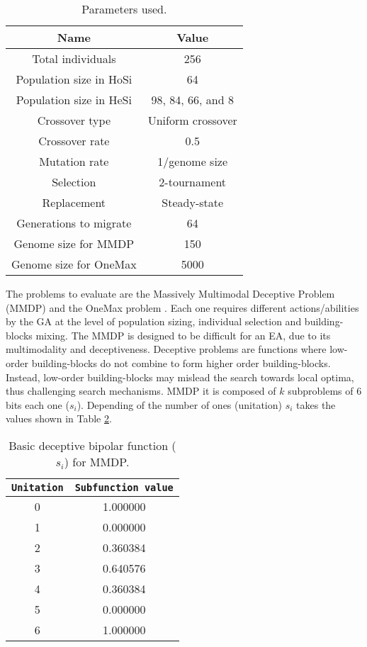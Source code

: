\begin{table}
\centering
\caption{Parameters used.}
\begin{tabular}{|c|c|} \hline
Name & Value\\ \hline
Total individuals & 256\\ \hline
Population size in HoSi & 64 \\ \hline
Population size in HeSi & 98, 84, 66, and 8\\ \hline
Crossover type & Uniform crossover \\ \hline
Crossover rate & 0.5\\ \hline
Mutation rate & 1/genome size\\ \hline
Selection & 2-tournament \\ \hline
Replacement & Steady-state\\ \hline
Generations to migrate & 64 \\ \hline
Genome size for MMDP & 150 \\ \hline
Genome size for OneMax & 5000 \\ 

\hline\end{tabular}
\label{table:parameters}
\end{table}

The problems to evaluate are the Massively Multimodal Deceptive Problem (MMDP) \cite{goldberg92massive} and the OneMax problem \cite{ONEMAX}. Each one requires different actions/abilities by the GA at the level of population sizing, individual selection and building-blocks mixing. The MMDP
 is designed to be difficult for an EA, due to
its multimodality and deceptiveness. Deceptive problems are functions where low-order building-blocks do not combine to form higher order building-blocks. Instead, low-order building-blocks may mislead the search towards local optima, thus challenging search mechanisms. MMDP it is composed of $k$ subproblems of 6 bits each one ($s_i$). Depending of
the number of ones (unitation) $s_i$ takes the values shown in Table \ref{table:mmdp}.  

\begin{table}[h]

\centering
{%
\caption{ Basic deceptive bipolar function ($s_i$) for MMDP.}
\begin{tabular}{|c|c|}
\hline
\texttt{Unitation}&\texttt{Subfunction value}\\
\hline
0 & 1.000000 \\
\hline
1 & 0.000000 \\
\hline
2 & 0.360384 \\
\hline
3 & 0.640576\\
\hline
4 & 0.360384\\
\hline
5 & 0.000000\\
\hline
6 & 1.000000\\
\hline

\end{tabular}
}

\label{table:mmdp}
\end{table}




